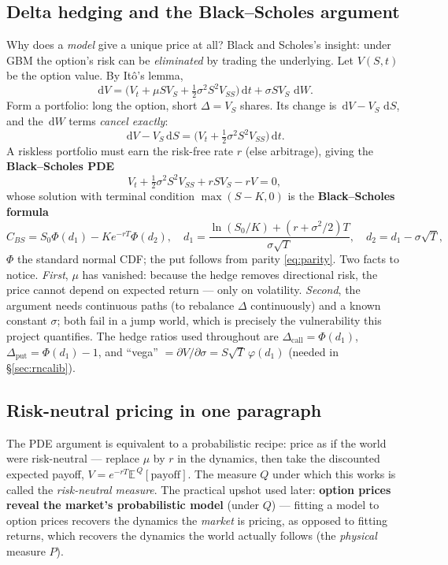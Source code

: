 \documentclass[11pt,a4paper]{article}
\newcommand{\E}{\mathbb{E}}
\newcommand{\dd}{\,\mathrm{d}}
\begin{document}
\subsection{Delta hedging and the Black--Scholes argument}
Why does a \emph{model} give a unique price at all? Black and Scholes's insight:
under GBM the option's risk can be \emph{eliminated} by trading the underlying.
Let $V(S,t)$ be the option value. By It\^o's lemma,
\begin{equation}
\dd V=\Big(V_t+\mu S V_S+\tfrac12\sigma^2S^2V_{SS}\Big)\dd t
+\sigma S V_S\,\dd W .
\end{equation}
Form a portfolio: long the option, short $\Delta=V_S$ shares. Its change is
$\dd V-V_S\,\dd S$, and the $\dd W$ terms \emph{cancel exactly}:
\begin{equation}
\dd V - V_S\dd S=\Big(V_t+\tfrac12\sigma^2S^2V_{SS}\Big)\dd t .
\end{equation}
A riskless portfolio must earn the risk-free rate $r$ (else arbitrage), giving
the \textbf{Black--Scholes PDE}
\begin{equation}
V_t+\tfrac12\sigma^2S^2V_{SS}+rSV_S-rV=0 ,
\label{eq:bspde}
\end{equation}
whose solution with terminal condition $\max(S-K,0)$ is the
\textbf{Black--Scholes formula}
\begin{equation}
C_{BS}=S_0\Phi(d_1)-Ke^{-rT}\Phi(d_2),\quad
d_1=\frac{\ln(S_0/K)+(r+\sigma^2/2)T}{\sigma\sqrt T},\quad
d_2=d_1-\sigma\sqrt T ,
\label{eq:bs}
\end{equation}
$\Phi$ the standard normal CDF; the put follows from parity \eqref{eq:parity}.
Two facts to notice. \emph{First}, $\mu$ has vanished: because the hedge removes
directional risk, the price cannot depend on expected return --- only on
volatility. \emph{Second}, the argument needs continuous paths (to rebalance
$\Delta$ continuously) and a known constant $\sigma$; both fail in a jump world,
which is precisely the vulnerability this project quantifies. The hedge ratios
used throughout are $\Delta_{\text{call}}=\Phi(d_1)$,
$\Delta_{\text{put}}=\Phi(d_1)-1$, and
``vega'' $=\partial V/\partial\sigma=S\sqrt{T}\,\varphi(d_1)$ (needed in
\S\ref{sec:rncalib}).

\subsection{Risk-neutral pricing in one paragraph}
\label{sec:rn}
The PDE argument is equivalent to a probabilistic recipe: price as if the world
were risk-neutral --- replace $\mu$ by $r$ in the dynamics, then take the
discounted expected payoff, $V=e^{-rT}\E^{\,Q}[\text{payoff}]$. The measure $Q$
under which this works is called the \emph{risk-neutral measure}. The practical
upshot used later: \textbf{option prices reveal the market's probabilistic
model} (under $Q$) --- fitting a model to option prices recovers the dynamics
the \emph{market} is pricing, as opposed to fitting returns, which recovers the
dynamics the world actually follows (the \emph{physical} measure $P$).
\end{document}
